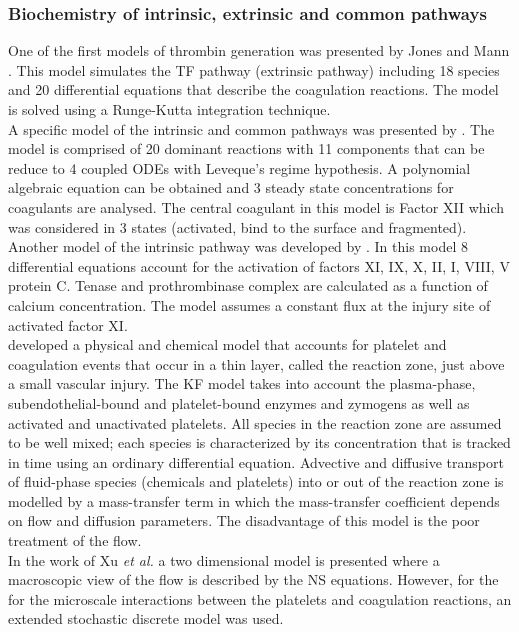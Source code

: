 \documentclass[%
 nofootinbib,
 amsmath,amssymb,
 aps,
 pra,
]{revtex4-1}
\begin{document}
\subsubsection{Biochemistry of intrinsic, extrinsic and common pathways}
One of the first models of thrombin generation was presented by Jones and Mann \citep{Jones:1994}. This model simulates the TF pathway (extrinsic pathway) including 18 species and 20 differential equations that describe the coagulation reactions. The model is solved using a Runge-Kutta integration technique.\\
A specific model of the intrinsic and common pathways was presented by \citet{Gregory:1994}. The model is comprised of 20 dominant reactions with 11 components that can be reduce to 4 coupled ODEs with Leveque's regime hypothesis. A polynomial algebraic equation can be obtained and 3 steady state concentrations for coagulants are analysed. The central coagulant in this model is Factor XII which was considered in 3 states (activated, bind to the surface and fragmented).\\
Another model of the intrinsic pathway was developed by \citet{Zarnitsina:1996}. In  this model 8 differential equations account for the activation of factors XI, IX, X, II, I, VIII, V protein C. Tenase and prothrombinase complex are calculated as a function of calcium concentration. The model assumes a constant flux at the injury site of activated factor XI.\\ 
\citet{Kuharsky:2001} developed a physical and chemical model that accounts for  platelet and coagulation events that occur in a thin layer, called the reaction zone, just above a small vascular injury. The KF model takes into account the plasma-phase, subendothelial-bound and platelet-bound enzymes and zymogens as well as activated and unactivated platelets. All species in the reaction zone are assumed to be well mixed; each species is characterized by its concentration that is tracked in time using an ordinary differential equation. Advective and diffusive transport of fluid-phase species (chemicals and platelets) into or out of the reaction zone is modelled by a mass-transfer term in which the mass-transfer coefficient depends on flow and diffusion parameters. The disadvantage of this model is the poor treatment of the flow.\\
In the work of Xu \textit{et al.} \cite{Xu:2008} a two dimensional model is presented where a macroscopic view of the flow is described by the NS equations. However, for the for the microscale interactions between the platelets and coagulation reactions, an extended stochastic discrete model was used.\\
\end{document}

